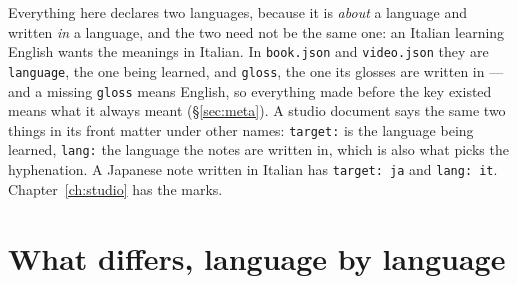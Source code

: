 \documentclass[11pt,oneside]{report}
\newcommand{\file}[1]{\texttt{#1}}
\begin{document}
Everything here declares two languages, because it is \emph{about} a language
and written \emph{in} a language, and the two need not be the same one: an
Italian learning English wants the meanings in Italian. In \file{book.json}
and \file{video.json} they are \texttt{language}, the one being learned, and
\texttt{gloss}, the one its glosses are written in --- and a missing
\texttt{gloss} means English, so everything made before the key existed means
what it always meant (\S\ref{sec:meta}). A studio document says the same two
things in its front matter under other names: \texttt{target:} is the
language being learned, \texttt{lang:} the language the notes are written in,
which is also what picks the hyphenation. A Japanese note written in Italian
has \texttt{target: ja} and \texttt{lang: it}. Chapter~\ref{ch:studio} has
the marks.

\section{What differs, language by language}
\end{document}
